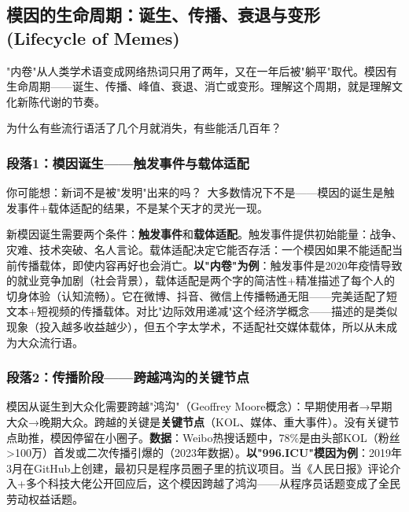 \documentclass[../main.tex]{subfiles}
\begin{document}
\subsection{模因的生命周期：诞生、传播、衰退与变形 (Lifecycle of Memes)}

\begin{motivation}

	"内卷"从人类学术语变成网络热词只用了两年，又在一年后被"躺平"取代。模因有生命周期——诞生、传播、峰值、衰退、消亡或变形。理解这个周期，就是理解文化新陈代谢的节奏。

\end{motivation}

\begin{questionbox}

	为什么有些流行语活了几个月就消失，有些能活几百年？

\end{questionbox}

\subsubsection*{段落1：模因诞生——触发事件与载体适配}

\begin{tcolorbox}[colback=yellow!5, title=\textit{读者行为预测}]

	你可能想：新词不是被"发明"出来的吗？\ 大多数情况下不是——模因的诞生是触发事件+载体适配的结果，不是某个天才的灵光一现。

\end{tcolorbox}

新模因诞生需要两个条件：\textbf{触发事件}和\textbf{载体适配}。触发事件提供初始能量：战争、灾难、技术突破、名人言论。载体适配决定它能否存活：一个模因如果不能适配当前传播载体，即使内容再好也会消亡。\textbf{以"内卷"为例}：触发事件是2020年疫情导致的就业竞争加剧（社会背景），载体适配是两个字的简洁性+精准描述了每个人的切身体验（认知流畅）。它在微博、抖音、微信上传播畅通无阻——完美适配了短文本+短视频的传播载体。对比"边际效用递减"这个经济学概念——描述的是类似现象（投入越多收益越少），但五个字太学术，不适配社交媒体载体，所以从未成为大众流行语。

\subsubsection*{段落2：传播阶段——跨越鸿沟的关键节点}

模因从诞生到大众化需要跨越"鸿沟"（Geoffrey Moore概念）：早期使用者→早期大众→晚期大众。跨越的关键是\textbf{关键节点}（KOL、媒体、重大事件）。没有关键节点助推，模因停留在小圈子。\textbf{数据}：Weibo热搜话题中，78\%是由头部KOL（粉丝>100万）首发或二次传播引爆的（2023年数据）。\textbf{以"996.ICU"模因为例}：2019年3月在GitHub上创建，最初只是程序员圈子里的抗议项目。当《人民日报》评论介入+多个科技大佬公开回应后，这个模因跨越了鸿沟——从程序员话题变成了全民劳动权益话题。
\end{document}
